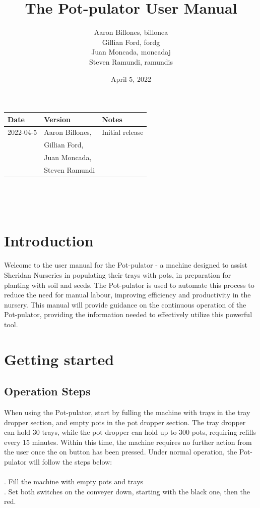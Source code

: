 \documentclass[12pt, titlepage]{article}
\title{The Pot-pulator User Manual}
\author{Aaron Billones, billonea\\Gillian Ford, fordg\\Juan Moncada, moncadaj\\Steven Ramundi, ramundis}
\date{April 5, 2022}
\begin{document}
\maketitle
\thispagestyle{empty}


\begin{tabularx}{\textwidth}{p{3cm}p{4cm}X}
    \toprule {\bf Date} & {\bf Version} & {\bf Notes}\\
    \midrule
    2022-04-5 & Aaron Billones,& Initial release\\&Gillian Ford,\\&Juan Moncada,\\&Steven Ramundi \\
    
    \bottomrule
\end{tabularx}

~\newpage

\tableofcontents

~\newpage


\section{Introduction}

Welcome to the user manual for the Pot-pulator - a machine designed to assist Sheridan Nurseries in populating their trays with pots, in preparation for planting with soil and seeds. The Pot-pulator is used to automate this process to reduce the need for manual labour, improving efficiency and productivity in the nursery. This manual will provide guidance on the continuous operation of the Pot-pulator, providing the information needed to effectively utilize this powerful tool.

\section{Getting started}

\subsection{Operation Steps}
When using the Pot-pulator, start by fulling the machine with trays in the tray dropper section, and empty pots in the pot dropper section. The tray dropper can hold 30 trays, while the pot dropper can hold up to 300 pots, requiring refills every 15 minutes. Within this time, the machine requires no further action from the user once the on button has been pressed. Under normal operation, the Pot-pulator will follow the steps below:
\\
\\ .	Fill the machine with empty pots and trays\\ 
.	Set both switches on the conveyer down, starting with the black one, then the red.
\end{document}

